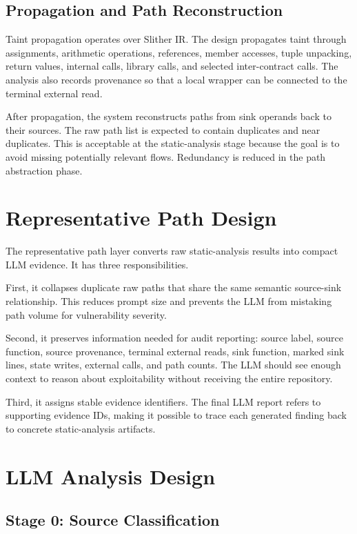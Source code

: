 \subsection{Propagation and Path Reconstruction}

Taint propagation operates over Slither IR. The design propagates taint through
assignments, arithmetic operations, references, member accesses, tuple
unpacking, return values, internal calls, library calls, and selected
inter-contract calls. The analysis also records provenance so that a local
wrapper can be connected to the terminal external read.

After propagation, the system reconstructs paths from sink operands back to
their sources. The raw path list is expected to contain duplicates and near
duplicates. This is acceptable at the static-analysis stage because the goal is
to avoid missing potentially relevant flows. Redundancy is reduced in the path
abstraction phase.

\section{Representative Path Design}

The representative path layer converts raw static-analysis results into compact
LLM evidence. It has three responsibilities.

First, it collapses duplicate raw paths that share the same semantic
source-sink relationship. This reduces prompt size and prevents the LLM from
mistaking path volume for vulnerability severity.

Second, it preserves information needed for audit reporting: source label,
source function, source provenance, terminal external reads, sink function,
marked sink lines, state writes, external calls, and path counts. The LLM should
see enough context to reason about exploitability without receiving the entire
repository.

Third, it assigns stable evidence identifiers. The final LLM report refers to
supporting evidence IDs, making it possible to trace each generated finding
back to concrete static-analysis artifacts.

\section{LLM Analysis Design}

\subsection{Stage 0: Source Classification}


